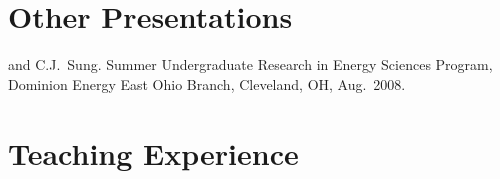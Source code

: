 \section{{\sectionfont Other Presentations}}

\begin{bibmune}
\item {} and C.J.\ Sung. 
        Summer Undergraduate Research in Energy Sciences Program,
        Dominion Energy East Ohio Branch, Cleveland, OH, Aug.\ 2008.
\end{bibmune}

\vspace{0.1in}

\section{{\sectionfont Teaching Experience}}


\vspace{0.25\baselineskip}

